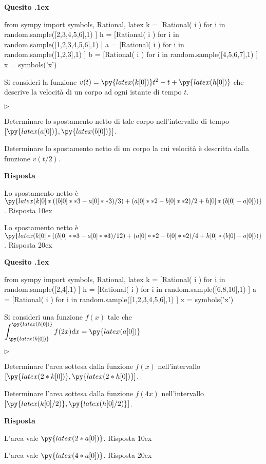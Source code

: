 \documentclass[11pt,twoside,a4paper]{article}
\newcommand{\mylabel}[1]{#1\hfill}
\renewenvironment{itemize}
  {\begin{list}{$\triangleright$}{%
   \setlength{\parskip}{0mm}
   \setlength{\topsep}{.4\baselineskip}
   \setlength{\rightmargin}{0mm}
   \setlength{\listparindent}{0mm}
   \setlength{\itemindent}{0mm}
   \setlength{\labelwidth}{2ex}
   \setlength{\itemsep}{.4\baselineskip}
   \setlength{\parsep}{0mm}
   \setlength{\partopsep}{0mm}
   \setlength{\labelsep}{1ex}
   \setlength{\leftmargin}{\labelwidth+\labelsep}
   \let\makelabel\mylabel}}{%
   \end{list}\vspace*{-1.3mm}}
\newcounter{quesito}
\newenvironment{question}{\bigskip\addtocounter{quesito}{1}\bigskip\bigskip\par\textbf{Quesito \thequesito.\kern1ex}}{\vspace{\parskip}}
\newenvironment{answer}{\par\textbf{Risposta\quad}}{\vspace{\parskip}}
\begin{document}
\begin{question}
\begin{pycode}
from sympy import symbols, Rational, latex
k = [Rational( i ) for i in random.sample([2,3,4,5,6],1) ]
h = [Rational( i ) for i in random.sample([1,2,3,4,5,6],1) ]
a = [Rational( i ) for i in random.sample([1,2,3],1) ]
b = [Rational( i ) for i in random.sample([4,5,6,7],1) ]
x = symbols('x')
\end{pycode}
Si consideri la funzione $v(t) = \py{latex(k[0])} t^2 - t +\py{latex(h[0])}$ che descrive la velocit\`a di un corpo ad ogni istante di tempo $t$.
\begin{itemize}
\item[1.] Determinare lo spostamento netto di tale corpo nell'intervallo di tempo $[\py{latex(a[0])}, \py{latex(b[0])}]$.
\item[2.] Determinare lo spostamento netto di un corpo la cui velocit\`a \`e descritta dalla funzione $v(t/2)$.
\end{itemize}
\begin{answer}

{\color{blue} Lo spostamento netto è $\displaystyle\py{latex(k[0]*((b[0]**3-a[0]**3)/3)+(a[0]**2-b[0]**2)/2+h[0]*(b[0]-a[0]))}$. 
\hfill Risposta 1\kern0ex}

\smallskip
{\color{blue} Lo spostamento netto è $\py{latex(k[0]*((b[0]**3-a[0]**3)/12)+(a[0]**2-b[0]**2)/4+h[0]*(b[0]-a[0]))}$.
\hfill Risposta 2\kern0ex}

\end{answer}
\end{question}
\begin{question}
\begin{pycode}
from sympy import symbols, Rational, latex
k = [Rational( i ) for i in random.sample([2,4],1) ]
h = [Rational( i ) for i in random.sample([6,8,10],1) ]
a = [Rational( i ) for i in random.sample([1,2,3,4,5,6],1) ]
x = symbols('x')
\end{pycode}
Si consideri una funzione $f(x)$ tale che $\displaystyle \int_{\py{latex(k[0])}}^{\py{latex(h[0])}} f(2x) dx = \py{latex(a[0])}$
\begin{itemize}
\item[1.] Determinare l'area sottesa dalla funzione $f(x)$ nell'intervallo $[\py{latex(2*k[0])},\py{latex(2*h[0])}]$.
\item[2.] Determinare l'area sottesa dalla funzione $f(4x)$ nell'intervallo $[\py{latex(k[0]/2)},\py{latex(h[0]/2)}]$.
\end{itemize}
\begin{answer}

{\color{blue} L'area vale $\py{latex(2*a[0])}$. 
\hfill Risposta 1\kern0ex}

\smallskip
{\color{blue}L'area vale $\py{latex(4*a[0])}$.
\hfill Risposta 2\kern0ex}

\end{answer}
\end{question}
\end{document}
